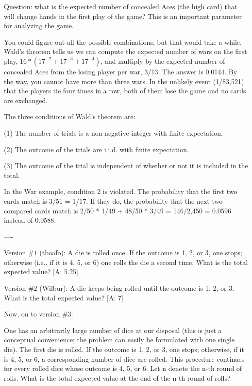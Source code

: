 Question: what is the expected number of concealed Aces (the high card) that will change hands in the first play of the game? This is an important parameter for analyzing the game.

You could figure out all the possible combinations, but that would take a while. Wald's theorem tells us we can compute the expected number of wars on the first play, $16*(17^{-2} + 17^{-3} + 17^{-4})$, and multiply by the expected number of concealed Aces from the losing player per war, 3/13. The answer is 0.0144. By the way, you cannot have more than three wars. In the unlikely event (1/83,521) that the players tie four times in a row, both of them lose the game and no cards are exchanged.

The three conditions of Wald's theorem are:

(1) The number of trials is a non-negative integer with finite expectation.

(2) The outcome of the trials are i.i.d. with finite expectation.

(3) The outcome of the trial is independent of whether or not it is included in the total. 

In the War example, condition 2 is violated. The probability that the first two cards match is 3/51 = 1/17. If they do, the probability that the next two compared cards match is 2/50 * 1/49 + 48/50 * 3/49 = 146/2,450 = 0.0596 instead of 0.0588. \par

----\par
Version $\#1$ (tboafo): A die is rolled once. If the outcome is 1, 2, or 3, one stops; otherwise (i.e., if it is 4, 5, or 6) one rolls the die a second time. What is the total expected value? [A: 5.25] \par

Version $\#2$ (Wilbur): A die keeps being rolled until the outcome is 1, 2, or 3. What is the total expected value? [A: 7]\par

Now, on to version $\#3$:\par

One has an arbitrarily large number of dice at our disposal (this is just a conceptual convenience; the problem can easily be formulated with one single die). The first die is rolled. If the outcome is 1, 2, or 3, one stops; otherwise, if it is 4, 5, or 6, a corresponding number of dice are rolled. This procedure continues for every rolled dice whose outcome is 4, 5, or 6. Let n denote the n-th round of rolls. What is the total expected value at the end of the n-th round of rolls?\par

